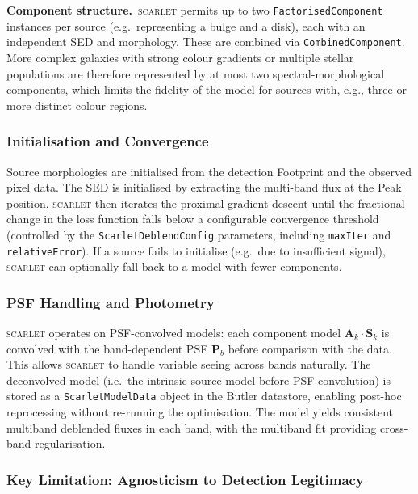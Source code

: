 \documentclass[DM,lsstdraft,authoryear,toc]{lsstdoc}
\newcommand{\scarlet}{\textsc{scarlet}\xspace}
\begin{document}
\textbf{Component structure.}\ \scarlet permits up to two
\texttt{FactorisedComponent} instances per source (e.g.\ representing a bulge
and a disk), each with an independent SED and morphology. These are combined
via \texttt{CombinedComponent}. More complex galaxies with strong colour
gradients or multiple stellar populations are therefore represented by at most
two spectral-morphological components, which limits the fidelity of the model
for sources with, e.g., three or more distinct colour regions.

\subsubsection{Initialisation and Convergence}
\label{sec:initialisation}

Source morphologies are initialised from the detection Footprint and the
observed pixel data. The SED is initialised by extracting the multi-band flux
at the Peak position. \scarlet then iterates the proximal gradient descent
until the fractional change in the loss function falls below a configurable
convergence threshold (controlled by the \texttt{ScarletDeblendConfig}
parameters, including \texttt{maxIter} and \texttt{relativeError}). If a
source fails to initialise (e.g.\ due to insufficient signal), \scarlet can
optionally fall back to a model with fewer components.

\subsubsection{PSF Handling and Photometry}
\label{sec:psf_handling}

\scarlet operates on PSF-convolved models: each component model
$\mathbf{A}_k \cdot \mathbf{S}_k$ is convolved with the band-dependent PSF
$\mathbf{P}_b$ before comparison with the data. This allows \scarlet to
handle variable seeing across bands naturally. The deconvolved model (i.e.\
the intrinsic source model before PSF convolution) is stored as a
\texttt{ScarletModelData} object in the Butler datastore, enabling post-hoc
reprocessing without re-running the optimisation. The model yields consistent
multiband deblended fluxes in each band, with the multiband fit providing
cross-band regularisation.

\subsubsection{Key Limitation: Agnosticism to Detection Legitimacy}
\label{sec:agnostic}
\end{document}
